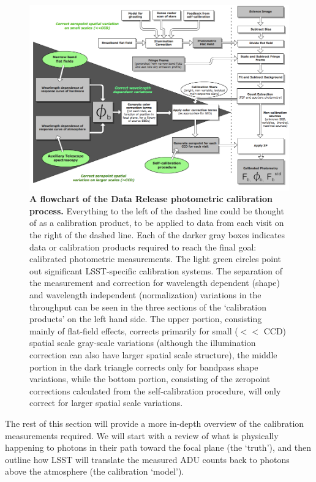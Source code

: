 \documentclass[12pt,preprint]{aastex}
\begin{document}
\begin{figure}[htbp]
\includegraphics[width=6.5in]{calib_overview}
\caption{ {\small {\bf A flowchart of the Data Release photometric
      calibration process.} Everything to the left of the dashed line
    could be thought of as a calibration product, to be applied to
    data from each visit on the right of the dashed line. Each of the
    darker gray boxes indicates data or calibration products required
    to reach the final goal: calibrated photometric measurements. The
    light green circles point out significant LSST-specific calibration
    systems. The separation of the measurement and correction for 
    wavelength dependent (shape) and wavelength independent
    (normalization) variations in the throughput can be seen in the
    three sections of the `calibration products' on the left hand
    side. The upper portion, consisting mainly of flat-field effects,
    corrects primarily for small ($<<$ CCD) spatial scale gray-scale variations (although
    the illumination correction can also have larger spatial scale
    structure), the middle portion in the dark triangle corrects only
    for bandpass shape variations, while the bottom portion,
    consisting of the zeropoint corrections calculated from the
    self-calibration procedure, will only correct for larger spatial
    scale variations. }
\label{fig:overview_flowchart} }
\end{figure}

The rest of this section will provide a more in-depth overview of the
calibration measurements required. We will start with a review of what
is physically happening to photons in their path toward the focal
plane (the `truth'), and then outline how LSST will translate the
measured ADU counts back to photons above the atmosphere (the
calibration `model').
\end{document}

